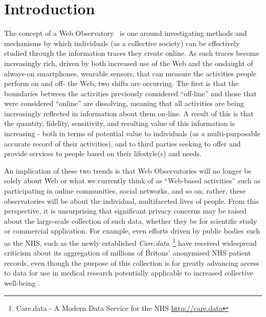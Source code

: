 \documentclass{acm_proc_article-sp}
\begin{document}


\maketitle
\begin{abstract}
\end{abstract}


\section{Introduction}

The concept of a Web Observatory~\cite{wobs} is one around investigating methods 
and mechanisms by which individuals (as a collective society) can be effectively 
studied through the information traces they create online. As such traces become 
increasingly rich, driven by both increased use of the Web and the onslaught of 
always-on smartphones, wearable sensors, that can measure the activities people 
perform on and off- the Web, two shifts are occurring. The first is that the 
boundaries between the activities previously considered ``off-line'' and those that were
considered ``online'' are dissolving, meaning that all activities are being increasingly 
reflected in information about them on-line. A result of this is that the quantity, 
fidelity, sensitivity, and resulting value of this information is increasing -
both in terms of potential value to individuals (as a multi-purposable accurate record 
of their activities), and to third parties seeking to offer and provide services 
to people based on their lifestyle(s) and needs. 

An implication of these two trends is that Web Observatories will no longer
be solely about Web or what we currently think of as ``Web-based activities''
such as participating in online communities, social networks, and so on; 
rather, these observatories will be about the individual, multifaceted lives 
of people.  From this perspective, it is unsurprising that significant privacy
concerns may be raised about the large-scale collection of such data, 
whether they be for scientific study or commercial application.  For example,
even efforts driven by public bodies such as the NHS, such as the newly established
\emph{Care.data}~\footnote{Care.data - A Modern Data Service for the NHS \url{http://care.data}}
have received widespread criticism about its aggregation of millions of Britons'
anonymised NHS patient records, even though the purpose of this
collection is for greatly advancing access to data for use in medical research
potentially applicable to increased collective well-being \cite{caredata}.
\end{document}
